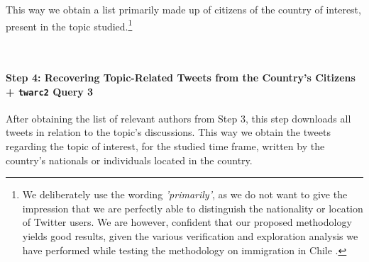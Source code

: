             This way we obtain a list primarily made up of citizens of the country of interest, present in the topic studied.\footnote{We deliberately use the wording {\it 'primarily'}, as we do not want to give the impression that we are perfectly able to distinguish the nationality or location of Twitter users. We are however, confident that our proposed methodology yields good results, given the various verification and exploration analysis we have performed while testing the methodology on immigration in Chile %
            .}
            
            

            
          \\
            \paragraph{Step 4: Recovering Topic-Related Tweets from the Country’s Citizens +  \texttt{twarc2} Query 3}
          \newline\indent   
            
            
            After obtaining the list of relevant authors from Step 3, this step downloads all tweets in relation to the topic's discussions. %
            This way we obtain the tweets regarding the topic of interest, for the studied time frame, written by the country's nationals or individuals located in the country.

